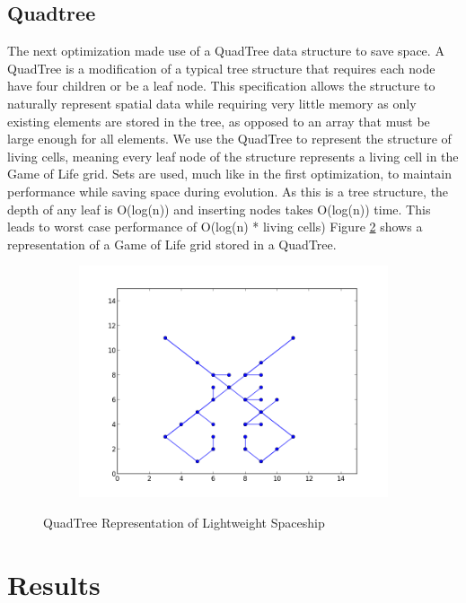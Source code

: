 \documentclass[11pt]{article}
\begin{document}
\subsection*{Quadtree}
The next optimization made use of a QuadTree data structure to save space.  A QuadTree\cite{quadtree} is a modification of a typical tree structure that requires each node have four children or be a leaf node.  This specification allows the structure to naturally represent spatial data while requiring very little memory as only existing elements are stored in the tree, as opposed to an array that must be large enough for all elements.  We use the QuadTree to represent the structure of living cells, meaning every leaf node of the structure represents a living cell in the Game of Life grid.  Sets are used, much like in the first optimization, to maintain performance while saving space during evolution.  As this is a tree structure, the depth of any leaf is O(log(n)) and inserting nodes takes O(log(n)) time.  This leads to worst case performance of O(log(n) * living cells)   Figure \ref{fig:quadtree_lws} shows a representation of a Game of Life grid stored in a QuadTree.
\begin{figure}
	\centering
	\begin{subfigure}{\textwidth}
		\centering
  	  	\includegraphics[width=1\linewidth]{images/quadtree_lws.png}
  	  	\label{fig:quad_lws}
	\end{subfigure}
	\caption{QuadTree Representation of Lightweight Spaceship}
	\label{fig:quadtree_lws}
\end{figure}
\section{Results}
\end{document}
